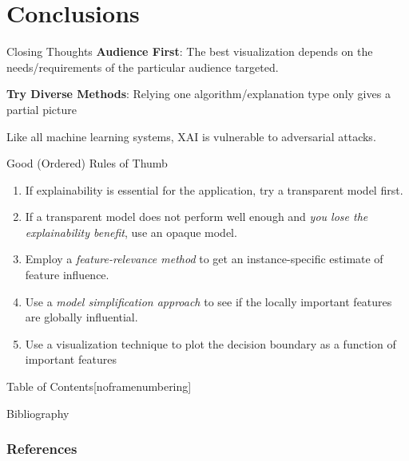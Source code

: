 \documentclass[11pt,dvipsnames,usenames,aspectratio=169]{beamer}  %
\begin{document}
\section{Conclusions}
\begin{frame}{Closing Thoughts}{}
  \textbf{Audience First}: The best visualization depends on the needs/requirements of the particular audience targeted.

  \vspace{18pt}
  \textbf{Try Diverse Methods}: Relying one algorithm/explanation type only gives a partial picture

  \vspace{18pt}
  Like all machine learning systems, XAI is vulnerable to adversarial attacks.
\end{frame}
\begin{frame}{Good (Ordered) Rules of Thumb}{}
  \begin{enumerate}
    \setlength{\itemsep}{16pt}
    \item If explainability is essential for the application, try a transparent model first.
    \item If a transparent model does not perform well enough and \textit{you lose the explainability benefit}, use an opaque model.
    \item Employ a \textit{feature-relevance method} to get an instance-specific estimate of feature influence.
    \item Use a \textit{model simplification approach} to see if the locally important features are globally influential.
    \item Use a visualization technique to plot the decision boundary as a function of important features
  \end{enumerate}
\end{frame}

\begin{frame}{Table of Contents}[noframenumbering]
  \tableofcontents
\end{frame}

\appendix

\begin{frame}[allowframebreaks]{Bibliography}{}
  {\tiny
    \frametitle{References}
    
    
  }
\end{frame}
\end{document}
